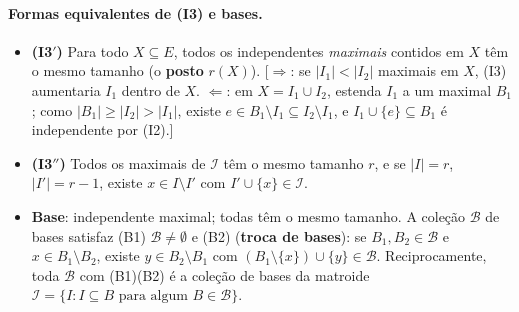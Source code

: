 \paragraph{Formas equivalentes de (I3) e bases.}
\begin{itemize}
  \item \textbf{(I3$'$)} Para todo $X\subseteq E$, todos os independentes \emph{maximais} contidos em $X$ têm o mesmo tamanho (o \textbf{posto} $r(X)$). [$\Rightarrow$: se $|I_1|<|I_2|$ maximais em $X$, (I3) aumentaria $I_1$ dentro de $X$. $\Leftarrow$: em $X=I_1\cup I_2$, estenda $I_1$ a um maximal $B_1$; como $|B_1|\ge|I_2|>|I_1|$, existe $e\in B_1\setminus I_1\subseteq I_2\setminus I_1$, e $I_1\cup\{e\}\subseteq B_1$ é independente por (I2).]
  \item \textbf{(I3$''$)} Todos os maximais de $\mathcal I$ têm o mesmo tamanho $r$, e se $|I|=r$, $|I'|=r-1$, existe $x\in I\setminus I'$ com $I'\cup\{x\}\in\mathcal I$.
  \item \textbf{Base}: independente maximal; todas têm o mesmo tamanho. A coleção $\mathcal B$ de bases satisfaz (B1) $\mathcal B\ne\emptyset$ e (B2) (\textbf{troca de bases}): se $B_1,B_2\in\mathcal B$ e $x\in B_1\setminus B_2$, existe $y\in B_2\setminus B_1$ com $(B_1\setminus\{x\})\cup\{y\}\in\mathcal B$. Reciprocamente, toda $\mathcal B$ com (B1)(B2) é a coleção de bases da matroide $\mathcal I=\{I:I\subseteq B\text{ para algum }B\in\mathcal B\}$.
\end{itemize}

